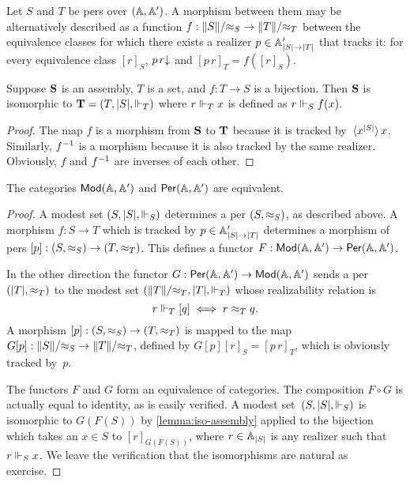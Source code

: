 Let $S$ and $T$ be pers over $(\mathbb{A}, \mathbb{A}')$. A morphism between them
may be alternatively described as a function $f : \|S\|/{\approx_S} \to
\|T\|/{\approx_T}$ between the equivalence classes for which there exists
a realizer $p \in \mathbb{A}'_{|S| \to |T|}$ that tracks it: for every
equivalence class $[r]_S$, $p\,r{\downarrow}$ and $[p\,r]_T = f([r]_S)$.

\begin{lemma}
  \label{lemma:iso-assembly}
  Suppose $\mathbf{S}$ is an assembly, $T$ is a set, and $f : T \to S$ is
  a bijection. Then $\mathbf{S}$ is isomorphic to $\mathbf{T} = (T, |S|,
  {\Vdash_T})$ where $r \Vdash_T x$ is defined as $r \Vdash_S f(x)$.
\end{lemma}


\begin{proof}
  The map $f$ is a morphism from $\mathbf{S}$ to $\mathbf{T}$ because it is
  tracked by~$\langle x^{|S|} \rangle\,{x}$. Similarly, ${f}^{-1}$ is a
  morphism because it is also tracked by the same realizer. Obviously,
  $f$ and ${f}^{-1}$ are inverses of each other.
\end{proof}


\begin{proposition}
  The categories $\mathsf{Mod}(\mathbb{A}, \mathbb{A}')$ and $\mathsf{Per}(\mathbb{A}, \mathbb{A}')$ are
  equivalent.
\end{proposition}

\begin{proof}
  A modest set $(S, |S|, {\Vdash_{S}})$ determines a per $(S, {\approx_S})$,
  as described above. A morphism $f : S \to T$ which is tracked by $p
  \in \mathbb{A}'_{|S| \to |T|}$ determines a morphism of pers $[p] : (S,
  {\approx_S}) \to (T, {\approx_T})$. This defines a functor $F : \mathsf{Mod}(\mathbb{A},
    \mathbb{A}') \to \mathsf{Per}(\mathbb{A}, \mathbb{A}')$.

  In the other direction the functor $G : \mathsf{Per}(\mathbb{A}, \mathbb{A}') \to
  \mathsf{Mod}(\mathbb{A}, \mathbb{A}')$ sends a per $(|T|, {\approx_T})$ to the modest set
  $(\|T\|/{\approx_T}, |T|, {\Vdash_T})$ whose realizability relation is
  \begin{equation*}
    r \Vdash_T [q] \iff r \approx_T q.
  \end{equation*}
  A morphism $[p] : (S, {\approx_S}) \to (T, {\approx_T})$ is mapped to the
  map $G [p] : \|S\|/{\approx_S} \to \|T\|/{\approx_T}$, defined by $G [p]
  [r]_S = [p\,r]_T$, which is obviously tracked by~$p$.

  The functors $F$ and $G$ form an equivalence of categories. The
  composition $F \circ G$ is actually equal to identity, as is easily
  verified. A modest set~$(S, |S|, {\Vdash_{S}})$ is isomorphic to
  $G(F(S))$ by \cref{lemma:iso-assembly} applied to the bijection
  which takes an $x \in S$ to $[r]_{G(F(S))}$, where $r \in \mathbb{A}_{|S|}$
  is any realizer such that $r \Vdash_S x$. We leave the verification
  that the isomorphisms are natural as exercise.
\end{proof}


